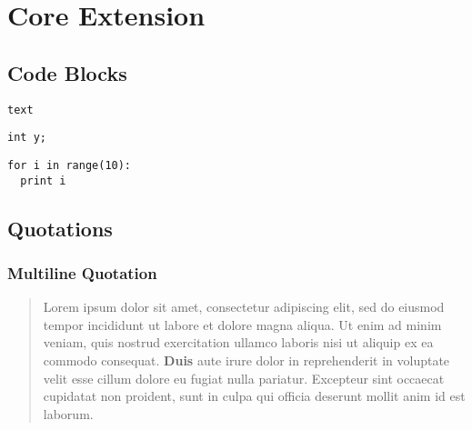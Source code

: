 
\chapter{\label{core-extension}Core Extension}
\section{\label{code-blocks}Code Blocks}
\begin{verbatim}
text
\end{verbatim}

\begin{verbatim}
int y;
\end{verbatim}

\begin{verbatim}
for i in range(10):
  print i
\end{verbatim}

\section{\label{quotations}Quotations}
\subsection{\label{multiline-quotation}Multiline Quotation}
\begin{quote}
\par Lorem ipsum dolor sit amet, consectetur adipiscing elit, sed do eiusmod tempor incididunt ut labore et dolore magna aliqua. Ut enim ad minim veniam, quis nostrud exercitation ullamco laboris nisi ut aliquip ex ea commodo consequat. \textbf{Duis} aute irure dolor in reprehenderit in voluptate velit esse cillum dolore eu fugiat nulla pariatur. Excepteur sint occaecat cupidatat non proident, sunt in culpa qui officia deserunt mollit anim id est laborum.
\end{quote}

